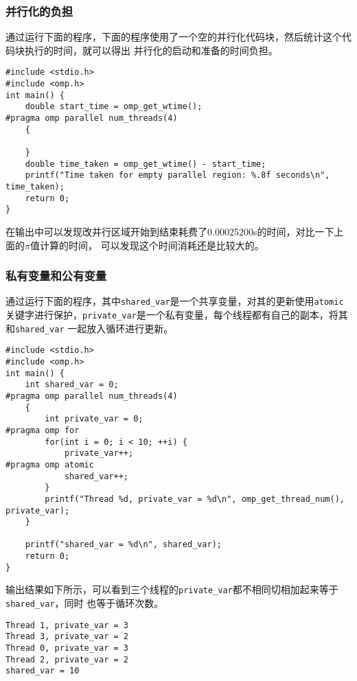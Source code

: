 \documentclass{article}
\begin{document}
\subsubsection{并行化的负担}
通过运行下面的程序，下面的程序使用了一个空的并行化代码块，然后统计这个代码块执行的时间，就可以得出
并行化的启动和准备的时间负担。
\begin{lstlisting}[style=cstyle,caption={并行化的负担}]
#include <stdio.h>
#include <omp.h>
int main() {
    double start_time = omp_get_wtime();
#pragma omp parallel num_threads(4)
    {

    }
    double time_taken = omp_get_wtime() - start_time;
    printf("Time taken for empty parallel region: %.8f seconds\n", time_taken);
    return 0;
}
\end{lstlisting}
在输出中可以发现改并行区域开始到结束耗费了0.00025200s的时间，对比一下上面的$\pi$值计算的时间，
可以发现这个时间消耗还是比较大的。
\subsubsection{私有变量和公有变量}
通过运行下面的程序，其中\texttt{shared\_var}是一个共享变量，对其的更新使用\texttt{atomic}
关键字进行保护，\texttt{private\_var}是一个私有变量，每个线程都有自己的副本，将其和\texttt{shared\_var}
一起放入循环进行更新。
\begin{lstlisting}[style=cstyle,caption={私有变量和公有变量}]
#include <stdio.h>
#include <omp.h>
int main() {
    int shared_var = 0;
#pragma omp parallel num_threads(4)
    {
        int private_var = 0;
#pragma omp for
        for(int i = 0; i < 10; ++i) {
            private_var++;
#pragma omp atomic
            shared_var++;
        }
        printf("Thread %d, private_var = %d\n", omp_get_thread_num(), private_var);
    }

    printf("shared_var = %d\n", shared_var);
    return 0;
}  
\end{lstlisting}
输出结果如下所示，可以看到三个线程的\texttt{private\_var}都不相同切相加起来等于\texttt{shared\_var}，同时
也等于循环次数。
\begin{lstlisting}[style=bashstyle]
Thread 1, private_var = 3
Thread 3, private_var = 2
Thread 0, private_var = 3
Thread 2, private_var = 2
shared_var = 10
\end{lstlisting}
\end{document}

